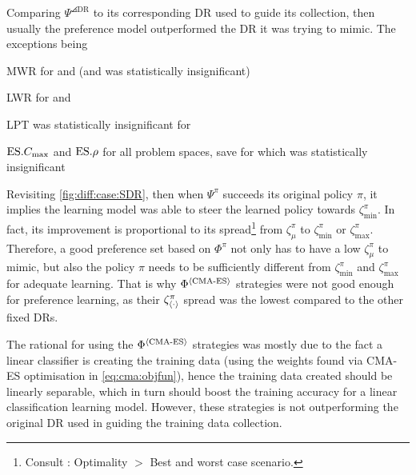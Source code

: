 
\pagebreak
Comparing $\Psi^{\angles{\text{DR}}}$ to its corresponding DR used to 
guide its collection, then usually the preference model outperformed the DR it 
was trying to mimic. The exceptions being 
\begin{enumerate*}
  \item MWR for  and  (and  was 
  statistically insignificant)
  \item LWR for  and 
  \item LPT was statistically insignificant for 
  \item $\text{ES}.{C_{\max}}$ and $\text{ES}.{\rho}$ for all problem spaces, save for  
  which was statistically insignificant
\end{enumerate*}
Revisiting \cref{fig:diff:case:SDR}, then when $\Psi^{\pi}$ 
succeeds its original policy $\pi$, it implies the learning model was able to 
steer the learned policy towards $\zeta_{\min}^{\pi}$. 
In fact, its improvement is proportional to its spread\footnote{Consult \shiny:
    Optimality $>$ Best and worst case scenario.}  
from $\zeta_{\mu}^{\pi}$ to $\zeta_{\min}^{\pi}$ or $\zeta_{\max}^{\pi}$.
Therefore, a good preference set based on $\Phi^\pi$ not only has to have a low 
$\zeta_{\mu}^\pi$ to mimic, but also the policy $\pi$ needs to be sufficiently 
different from $\zeta_{\min}^{\pi}$ and $\zeta_{\max}^{\pi}$ for adequate 
learning. That is why $\Phi^{\langle \text{CMA-ES} \rangle}$ strategies 
were not good enough for preference learning, as their 
$\zeta^\pi_{\langle \cdot \rangle}$ spread was the lowest compared to the other fixed DRs.

The rational for using the $\Phi^{\langle \text{CMA-ES} \rangle}$ strategies
was mostly due to the fact a linear classifier is creating the training data 
(using the weights found via CMA-ES optimisation in \cref{eq:cma:objfun}), 
hence the training data created should be linearly separable, which in turn 
should boost the training accuracy for a linear classification learning model. 
However, these strategies is not outperforming the original DR used in guiding 
the training data collection. 

